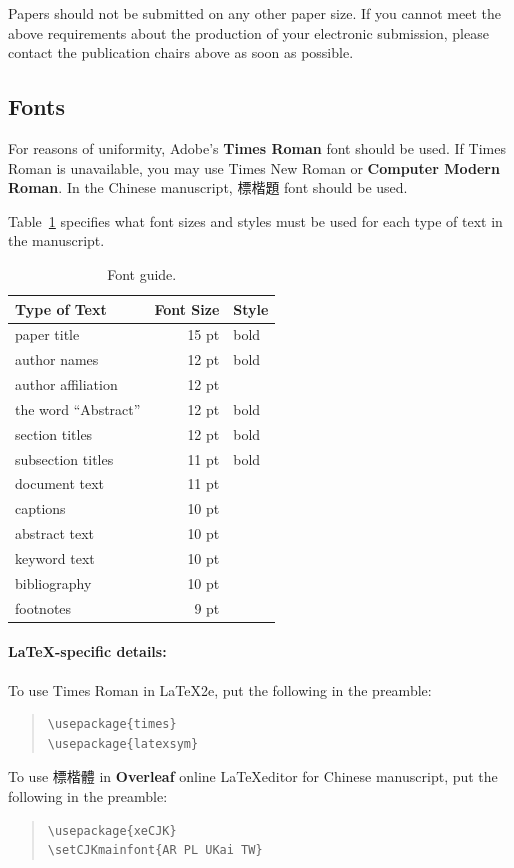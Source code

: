 \documentclass[11pt,a4paper]{article}
\begin{document}
\noindent Papers should not be submitted on any other paper size.
If you cannot meet the above requirements about the production of your electronic submission, please contact the publication chairs above as soon as possible.

\subsection{Fonts}

For reasons of uniformity, Adobe's \textbf{Times Roman} font should be used.
If Times Roman is unavailable, you may use Times New Roman or \textbf{Computer Modern Roman}. 
In the Chinese manuscript, 標楷題 font should be used.

Table~\ref{font-table} specifies what font sizes and styles must be used for each type of text in the manuscript.

\begin{table}
\centering
\begin{tabular}{lrl}
\hline \textbf{Type of Text} & \textbf{Font Size} & \textbf{Style} \\ \hline
paper title & 15 pt & bold \\
author names & 12 pt & bold \\
author affiliation & 12 pt & \\
the word ``Abstract'' & 12 pt & bold \\
section titles & 12 pt & bold \\
subsection titles & 11 pt & bold \\
document text & 11 pt  &\\
captions & 10 pt & \\
abstract text & 10 pt & \\
keyword text & 10 pt & \\
bibliography & 10 pt & \\
footnotes & 9 pt & \\
\hline
\end{tabular}
\caption{\label{font-table} Font guide. }
\end{table}

\paragraph{\LaTeX-specific details:}
To use Times Roman in \LaTeX2e{}, put the following in the preamble:
\begin{quote}
\small
\begin{verbatim}
\usepackage{times}
\usepackage{latexsym}
\end{verbatim}
\end{quote}
To use 標楷體 in \textbf{Overleaf} online \LaTeX editor for Chinese manuscript, put the following in the preamble:
\begin{quote}
\small
\begin{verbatim}
\usepackage{xeCJK}
\setCJKmainfont{AR PL UKai TW}
\end{verbatim}
\end{quote}
\end{document}
